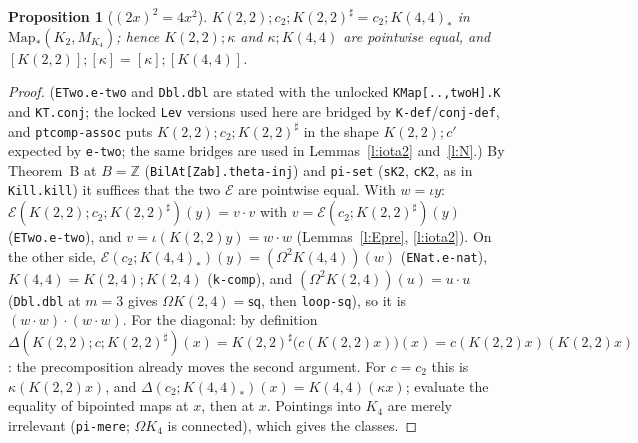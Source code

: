 \documentclass[11pt]{amsart}
\newtheorem{proposition}[theorem]{Proposition}
\theoremstyle{definition}
\theoremstyle{remark}
\newcommand{\Om}{\Omega}
\newcommand{\Map}{\mathrm{Map}_*}
\newcommand{\Z}{\mathbb{Z}}
\newcommand{\code}[1]{\texttt{#1}}
\newcommand{\lp}{\Omega}
\newcommand{\cls}[1]{[#1]}
\newcommand{\sq}{\mathsf{sq}}
\newcommand{\cE}{\mathcal E}
\begin{document}
\begin{proposition}[$(2x)^2=4x^2$]\label{p:Q}
$K(2,2);c_2;K(2,2)^\sharp=c_2;K(4,4)_*$ in $\Map(K_2,M_{K_4})$; hence
$K(2,2);\kappa$ and $\kappa;K(4,4)$ are pointwise equal, and
$\cls{K(2,2)};\cls\kappa=\cls\kappa;\cls{K(4,4)}$.
\end{proposition}
\begin{proof}
(\code{ETwo.e-two} and \code{Dbl.dbl} are stated with the unlocked
\code{KMap[..,twoH].K} and \code{KT.conj}; the locked \code{Lev} versions used here are
bridged by \code{K-def}/\code{conj-def}, and \code{ptcomp-assoc} puts
$K(2,2);c_2;K(2,2)^\sharp$ in the shape $K(2,2);c'$ expected by \code{e-two}; the same
bridges are used in Lemmas~\ref{l:iota2} and~\ref{l:N}.)
By Theorem~B at $B=\Z$ (\code{BilAt[Zab].theta-inj}) and \code{pi-set}
(\code{sK2}, \code{cK2}, as in \code{Kill.kill}) it suffices that the two
$\cE$ are pointwise equal. With $w=\iota y$:
$\cE(K(2,2);c_2;K(2,2)^\sharp)(y)=v\cdot v$ with $v=\cE(c_2;K(2,2)^\sharp)(y)$
(\code{ETwo.e-two}), and $v=\iota(K(2,2)y)=w\cdot w$ (Lemmas~\ref{l:Epre},
\ref{l:iota2}). On the other side, $\cE(c_2;K(4,4)_*)(y)=(\lp^2K(4,4))(w)$
(\code{ENat.e-nat}), $K(4,4)=K(2,4);K(2,4)$ (\code{k-comp}), and
$(\lp^2K(2,4))(u)=u\cdot u$ (\code{Dbl.dbl} at $m=3$ gives $\lp K(2,4)=\sq$, then
\code{loop-sq}), so it is $(w\cdot w)\cdot(w\cdot w)$. For the diagonal: by
definition $\Delta(K(2,2);c;K(2,2)^\sharp)(x)=K(2,2)^\sharp\bigl(c(K(2,2)x)\bigr)(x)
=c(K(2,2)x)(K(2,2)x)$: the precomposition already moves the second argument.
For $c=c_2$ this is $\kappa(K(2,2)x)$, and $\Delta(c_2;K(4,4)_*)(x)=K(4,4)(\kappa x)$;
evaluate the equality of bipointed maps at $x$, then at $x$. Pointings into $K_4$ are merely
irrelevant (\code{pi-mere}; $\Om K_4$ is connected), which gives the classes.
\end{proof}
\end{document}
